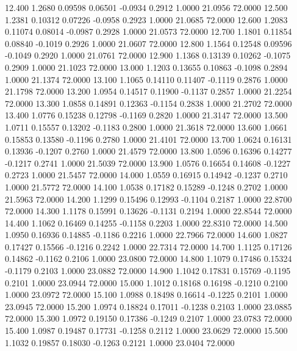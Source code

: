   12.400   1.2680   0.09598   0.06501  -0.0934   0.2912   1.0000  21.0956  72.0000
  12.500   1.2381   0.10312   0.07226  -0.0958   0.2923   1.0000  21.0685  72.0000
  12.600   1.2083   0.11074   0.08014  -0.0987   0.2928   1.0000  21.0573  72.0000
  12.700   1.1801   0.11854   0.08840  -0.1019   0.2926   1.0000  21.0607  72.0000
  12.800   1.1564   0.12548   0.09596  -0.1049   0.2920   1.0000  21.0761  72.0000
  12.900   1.1368   0.13139   0.10262  -0.1075   0.2909   1.0000  21.1023  72.0000
  13.000   1.1203   0.13655   0.10863  -0.1098   0.2894   1.0000  21.1374  72.0000
  13.100   1.1065   0.14110   0.11407  -0.1119   0.2876   1.0000  21.1798  72.0000
  13.200   1.0954   0.14517   0.11900  -0.1137   0.2857   1.0000  21.2254  72.0000
  13.300   1.0858   0.14891   0.12363  -0.1154   0.2838   1.0000  21.2702  72.0000
  13.400   1.0776   0.15238   0.12798  -0.1169   0.2820   1.0000  21.3147  72.0000
  13.500   1.0711   0.15557   0.13202  -0.1183   0.2800   1.0000  21.3618  72.0000
  13.600   1.0661   0.15853   0.13580  -0.1196   0.2780   1.0000  21.4101  72.0000
  13.700   1.0624   0.16131   0.13936  -0.1207   0.2760   1.0000  21.4579  72.0000
  13.800   1.0596   0.16396   0.14277  -0.1217   0.2741   1.0000  21.5039  72.0000
  13.900   1.0576   0.16654   0.14608  -0.1227   0.2723   1.0000  21.5457  72.0000
  14.000   1.0559   0.16915   0.14942  -0.1237   0.2710   1.0000  21.5772  72.0000
  14.100   1.0538   0.17182   0.15289  -0.1248   0.2702   1.0000  21.5963  72.0000
  14.200   1.1299   0.15496   0.12993  -0.1104   0.2187   1.0000  22.8700  72.0000
  14.300   1.1178   0.15991   0.13626  -0.1131   0.2194   1.0000  22.8544  72.0000
  14.400   1.1062   0.16469   0.14255  -0.1158   0.2203   1.0000  22.8310  72.0000
  14.500   1.0950   0.16936   0.14885  -0.1186   0.2216   1.0000  22.7966  72.0000
  14.600   1.0827   0.17427   0.15566  -0.1216   0.2242   1.0000  22.7314  72.0000
  14.700   1.1125   0.17126   0.14862  -0.1162   0.2106   1.0000  23.0800  72.0000
  14.800   1.1079   0.17486   0.15324  -0.1179   0.2103   1.0000  23.0882  72.0000
  14.900   1.1042   0.17831   0.15769  -0.1195   0.2101   1.0000  23.0944  72.0000
  15.000   1.1012   0.18168   0.16198  -0.1210   0.2100   1.0000  23.0972  72.0000
  15.100   1.0988   0.18498   0.16614  -0.1225   0.2101   1.0000  23.0945  72.0000
  15.200   1.0974   0.18824   0.17011  -0.1238   0.2103   1.0000  23.0885  72.0000
  15.300   1.0972   0.19150   0.17386  -0.1249   0.2107   1.0000  23.0783  72.0000
  15.400   1.0987   0.19487   0.17731  -0.1258   0.2112   1.0000  23.0629  72.0000
  15.500   1.1032   0.19857   0.18030  -0.1263   0.2121   1.0000  23.0404  72.0000

